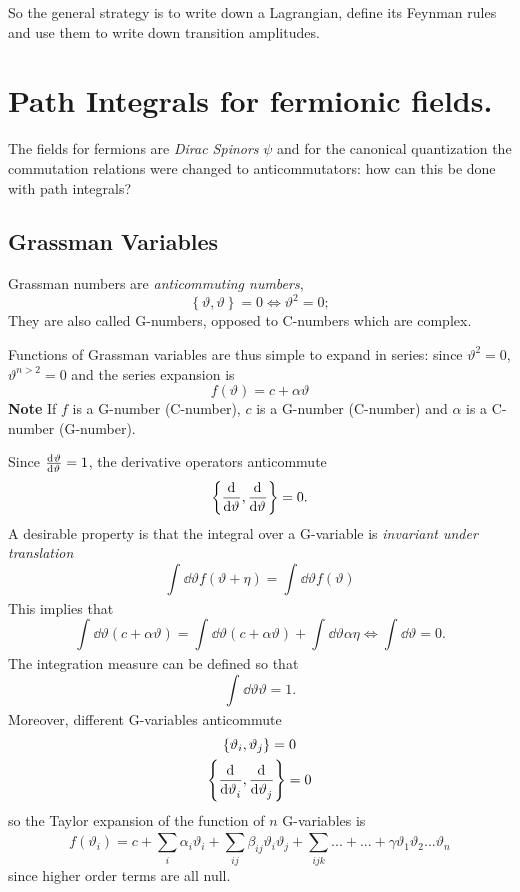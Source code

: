 
So the general strategy is to write down a Lagrangian, define its Feynman rules
and use them to write down transition amplitudes.
\chapter{Path Integrals for fermionic fields.}
The fields for fermions are \textit{Dirac Spinors} $\psi$ and for the canonical
quantization the commutation relations were changed to anticommutators: how can
this be done with path integrals?

\section{Grassman Variables}
Grassman numbers are \textit{anticommuting numbers},
\[
    \left\{\vartheta,\vartheta \right\}=0\iff \vartheta^2 = 0;
\]
They are also called G-numbers, opposed to C-numbers which are complex.

Functions of Grassman variables are thus simple to expand in series: since
$\vartheta^2=0$, $\vartheta^{n>2}=0$ and the series expansion is
\[
    f(\vartheta ) = c +\alpha \vartheta
\]
\textbf{Note} If $f$ is a G-number (C-number), $c$ is a G-number (C-number) and
$\alpha $ is a C-number (G-number).

Since $\dv[]{\vartheta }{\vartheta }=1$, the derivative operators anticommute
\[
    \left\{\dv[]{}{\vartheta },\dv[]{}{\vartheta }\right\}=0.
\]
A desirable property is that the integral over a G-variable is
\textit{invariant under translation}
\[
    \int_{}^{} \dd \vartheta f(\vartheta +\eta ) = \int_{}^{} \dd \vartheta
    f(\vartheta )
\]
This implies that
\[
    \int_{}^{} \dd \vartheta (c+\alpha \vartheta ) = \int_{}^{} \dd \vartheta 
    (c+\alpha \vartheta )+\int_{}^{} \dd \vartheta \alpha \eta \iff
    \int_{}^{} \dd \vartheta =0.
\]
The integration measure can be defined so that
\[
    \int_{}^{} \dd \vartheta \vartheta  = 1.
\]
Moreover, different G-variables anticommute
\begin{gather*}
    \left\{\vartheta_i,\vartheta_j\right\}=0\\
    \left\{\dv[]{}{\vartheta _i},\dv[]{}{\vartheta _j}\right\}=0
\end{gather*}
so the Taylor expansion of the function of $n$ G-variables is
\[
    f(\vartheta_i) = c+ \sum_{i}^{}\alpha_i\vartheta _i + \sum_{ij}^{} \beta _{ij}
    \vartheta _i\vartheta _j + \sum_{ijk}^{} ...+... +
    \gamma \vartheta_1\vartheta_2...\vartheta_n
\]
since higher order terms are all null.

